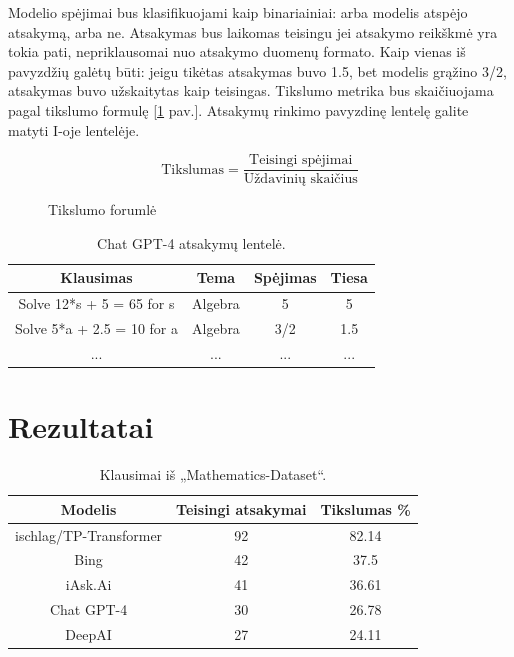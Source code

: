 \documentclass[conference]{IEEEtran}
\begin{document}
Modelio spėjimai bus klasifikuojami kaip binariainiai: arba modelis atspėjo atsakymą, arba ne.
Atsakymas bus laikomas teisingu jei atsakymo reikškmė yra tokia pati, nepriklausomai nuo atsakymo duomenų formato.
Kaip vienas iš pavyzdžių galėtų būti: jeigu tikėtas atsakymas buvo 1.5, bet modelis grąžino
3/2, atsakymas buvo užskaitytas kaip teisingas.
Tikslumo metrika bus skaičiuojama pagal tikslumo formulę [\ref{fig:tikslumas} pav.]. Atsakymų rinkimo pavyzdinę lentelę galite matyti I-oje lentelėje.
\begin{figure}[ht]
\centering
\begin{equation}
\text{Tikslumas} = \frac{\text{Teisingi spėjimai}}{\text{Uždavinių skaičius}}
\end{equation}
\caption{Tikslumo forumlė}
\label{fig:tikslumas}
\end{figure}





\begin{table}[h!]
    \centering
    \caption{Chat GPT-4 atsakymų lentelė.}
    \label{lentele:1}
    \begin{tabular}{|c c c c|} 
     \hline
     Klausimas & Tema & Spėjimas & Tiesa  \\ [0.5ex] 
     \hline\hline
     Solve 12*s + 5 = 65 for s& Algebra & 5 & 5 \\ 
     \hline
    Solve 5*a + 2.5 = 10 for a & Algebra & 3/2 & 1.5 \\ 
     \hline
         ... & ... & ... & ... \\ 
     \hline
    \end{tabular}
    \end{table}

\section{Rezultatai}
\begin{table}[h!]
    \centering
    \caption{Klausimai iš „Mathematics-Dataset“.}
    \label{lentele:1}
    \begin{tabular}{|c c c|} 
     \hline
     Modelis & Teisingi atsakymai & Tikslumas \% \\ [0.5ex] 
     \hline\hline
     ischlag/TP-Transformer & 92 & 82.14 \\ 
     \hline
     Bing & 42 & 37.5 \\
     \hline
     iAsk.Ai & 41 & 36.61 \\
     \hline
     Chat GPT-4 & 30 & 26.78 \\
     \hline
     DeepAI & 27 & 24.11 \\
     \hline
    \end{tabular}
    \end{table}
\end{document}
